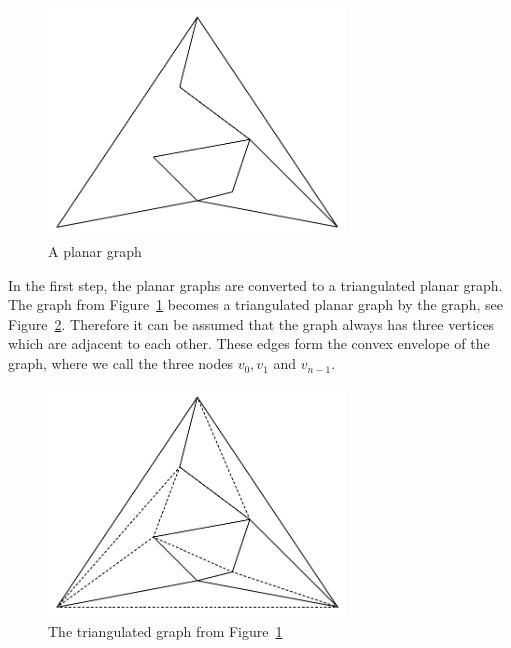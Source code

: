 \documentclass[a4paper]{scrartcl}
\begin{document}
\begin{figure}[h]
	\centering
	\includegraphics[width=0.7\textwidth]{img/planar}
	\caption{A planar graph}
	\label{fig:planar}
\end{figure}


In the first step, the planar graphs are converted to a triangulated planar graph.
The graph from Figure~\ref{fig:planar} becomes a triangulated planar graph by the graph, see Figure~\ref{fig:triangulated}.
Therefore it can be assumed that the graph always has three vertices which are adjacent to each other. These edges form the convex envelope of the graph, where we call the three nodes $v_0,v_1$ and $v_{n-1}$.



\begin{figure}[h]
	\centering
	\includegraphics[width=0.7\textwidth]{img/triangulated}
	\caption{The triangulated  graph from Figure~\ref{fig:planar}}
	\label{fig:triangulated}
\end{figure}
\end{document}
